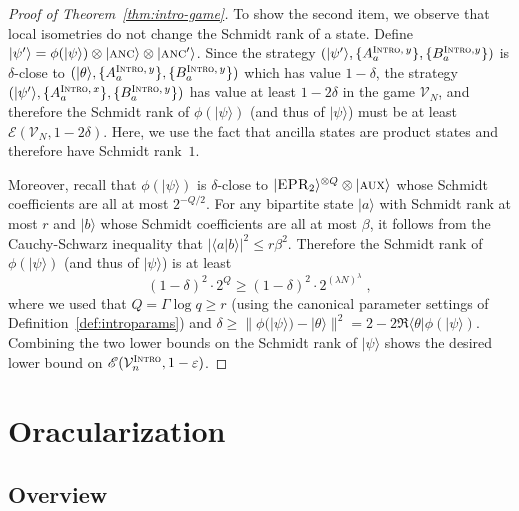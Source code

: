 \documentclass[11pt]{article}
\theoremstyle{definition}
\newcommand{\ket}[1]{|#1\rangle}
\newcommand{\bra}[1]{\langle#1|}
\newcommand{\eps}{\varepsilon}
\newcommand{\verifier}{\mathcal{V}}
\newcommand{\gamestyle}[1]{\ensuremath{\textsc{#1}}\xspace}
\newcommand{\intro}{\gamestyle{Intro}}
\newcommand{\labelstyle}[1]{\ensuremath{\textsc{#1}}\xspace}
\newcommand{\EPR}{\labelstyle{EPR}}
\newcommand{\aux}{\labelstyle{aux}}
\newcommand{\ancilla}{\labelstyle{anc}}
\newcommand{\typestyle}[1]{\ensuremath{\textsc{#1}}\xspace}
\newcommand{\Intro}{\typestyle{Intro}}
\newcommand{\Ent}{\mathscr{E}}
\begin{document}
\begin{proof}[Proof of Theorem~\ref{thm:intro-game}]
  To show the second item, we observe that local isometries do not change the
  Schmidt rank of a state.
  Define $\ket{\psi'} = \phi(\ket{\psi}) \otimes \ket{\ancilla} \otimes
  \ket{\ancilla'}$.
  Since the strategy $(\ket{\psi'}, \{ A^{\Intro,\, y}_a \},\{ B^{\Intro, y}_a
  \})$ is $\delta$-close to $(\ket{\theta}, \{ A^{\Intro,\, y}_a \},\{
  B^{\Intro,\, y}_a \})$ which has value $1 - \delta$, the strategy
  $(\ket{\psi'}, \{ A^{\Intro,\, x}_a \},\{ B^{\Intro,\, y}_a \})$ has value at
  least $1 - 2\delta$ in the game $\verifier_N$, and therefore the Schmidt rank
  of $\phi(\ket{\psi})$ (and thus of $\ket{\psi}$) must be at least
  $\Ent(\verifier_N,1 - 2\delta)$.
  Here, we use the fact that ancilla states are product states and therefore
  have Schmidt rank~$1$.
  
  Moreover, recall that $\phi(\ket{\psi})$ is $\delta$-close to
  $\ket{\EPR_2}^{\otimes Q} \otimes \ket{\aux}$ whose Schmidt coefficients are
  all at most $2^{-Q/2}$.
  For any bipartite state $\ket{a}$ with Schmidt rank at most $r$ and $\ket{b}$
  whose Schmidt coefficients are all at most $\beta$, it follows from the
  Cauchy-Schwarz inequality that $|\langle a | b \rangle|^2 \leq r \beta^2$.
  Therefore the Schmidt rank of $\phi(\ket{\psi})$ (and thus of $\ket{\psi}$) is
  at least
  \[
  	\left (1 - \delta \right)^2 \cdot 2^{Q} \geq \left
      (1 - \delta \right)^2 \cdot 2^{(\lambda N)^\lambda}\;,
  \]
  where we used that $Q = \Gamma \log q \geq r$ (using the canonical parameter
  settings of Definition~\ref{def:introparams}) and $\delta \geq \|
  \phi(\ket{\psi}) - \ket{\theta} \|^2 = 2 - 2\Re \bra{\theta}
  \phi(\ket{\psi})$.
  Combining the two lower bounds on the Schmidt rank of $\ket{\psi}$ shows the
  desired lower bound on $\Ent(\verifier^\intro_n,1 - \eps)$.
\end{proof}


\section{Oracularization}
\label{sec:oracle}

\subsection{Overview}
\end{document}
